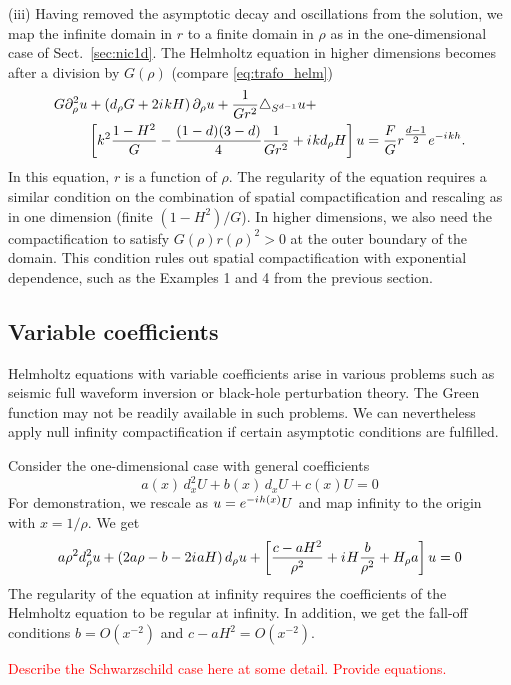 \documentclass[draft,onefignum,onetabnum]{siamart190516}
\newcommand{\iu}{{i\mkern1mu}}
\begin{document}
(iii) Having removed the asymptotic decay and oscillations from the solution, we map the infinite domain in $r$ to a finite domain in $\rho$ as in the one-dimensional case of Sect.~\ref{sec:nic1d}. The Helmholtz equation in higher dimensions becomes after a division by $G(\rho)$ (compare \eqref{eq:trafo_helm})
\begin{align}
	\label{eq:hyp_general}
	G \partial_\rho^2 u & + \left( d_\rho G + 2 \iu k H \right) \partial_\rho u + \frac{1}{G r^2}\triangle_{S^{d-1}} u +  \nonumber                        \\
	               & \left[k^2 \frac{1-H^2}{G} - \frac{(1-d)(3-d)}{4} \frac{1}{G r^2} + \iu k d_\rho H \right] u = \frac{F}{G} r^{\tfrac{d-1}{2}} e^{-\iu k h}.
\end{align}
In this equation, $r$ is a function of $\rho$. The regularity of the equation requires a similar condition on the combination of spatial compactification and rescaling as in one dimension (finite $(1-H^2)/G$). In higher dimensions, we also need the compactification to satisfy $G(\rho)r(\rho)^2>0$ at the outer boundary of the domain. This condition rules out spatial compactification with exponential dependence, such as the Examples 1 and 4 from the previous section.
\subsection{Variable coefficients}

Helmholtz equations with variable coefficients arise in various problems such as seismic full waveform inversion or black-hole perturbation theory. The Green function may not be readily available in such problems. We can nevertheless apply null infinity compactification if certain asymptotic conditions are fulfilled.  

Consider the one-dimensional case with general coefficients
\[ a(x) \, d_x^2 U + b(x) \, d_x U + c(x) U = 0 \]
For demonstration, we rescale as $u=e^{-\iu h(x)} U$ and map infinity to the origin with $x=1/\rho$. We get 
\[ a \rho^2 d_\rho^2 u + \left( 2 a \rho - b - 2 \iu a H \right) d_\rho u + \left[ \frac{c-a H^2}{\rho^2} + \iu H \frac{b}{\rho^2} + H_\rho a \right] u = 0 \]
The regularity of the equation at infinity requires the coefficients of the Helmholtz equation to be regular at infinity. In addition, we get the fall-off conditions $b=O(x^{-2})$ and $c-a H^2=O(x^{-2})$.

\textcolor{red}{Describe the Schwarzschild case here at some detail. Provide equations.}
\end{document}
